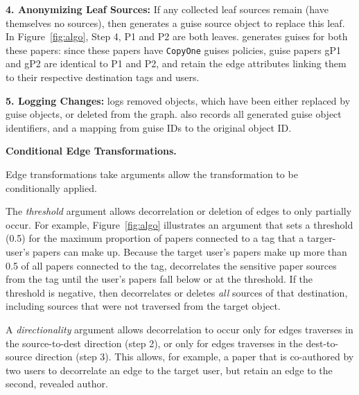            \vspace{0.5\baselineskip}\noindent\textbf{4. Anonymizing Leaf Sources:}
        If any collected leaf sources remain (have themselves no sources), then \sys generates a
        guise source object to replace this leaf.
        In Figure~\ref{fig:algo}, Step 4, P1 and P2 are both leaves. \sys generates guises for both
        these papers: since these papers have \texttt{CopyOne} guises policies, guise papers gP1 and
        gP2 are identical to P1 and P2, and retain the edge attributes linking them to their
        respective destination tags and users.

    \vspace{0.5\baselineskip}\noindent\textbf{5. Logging Changes:} 
    \sys logs removed objects, which have been either replaced by guise objects, or deleted
    from the graph. \sys also records all generated guise object identifiers, and a mapping from
    guise IDs to the original object ID. 

    \vspace{0.5\baselineskip}\noindent\textbf{Conditional Edge Transformations.}

        Edge transformations take arguments allow the transformation to be conditionally applied.

        The \emph{threshold} argument allows decorrelation or deletion of edges to only partially
        occur. 
        For example, Figure~\ref{fig:algo} illustrates an argument that sets a threshold (0.5) for the
        maximum proportion of papers connected to a tag that a targer-user's papers can make up.
        Because the target user's papers make up more than 0.5 of all papers connected to the tag,
        \sys decorrelates the sensitive paper sources from the tag until the user's papers fall
        below or at the threshold.
        If the threshold is negative, then \sys decorrelates or deletes \emph{all} sources of that
        destination, including sources that were not traversed from the target object.

        A \emph{directionality} argument allows decorrelation to occur only for edges \sys traverses
        in the source-to-dest direction (step 2), or only for edges \sys traverses in the dest-to-source
        direction (step 3). This allows, for example, a paper that is co-authored by two users to
        decorrelate an edge to the target user, but retain an edge to the second, revealed author.

